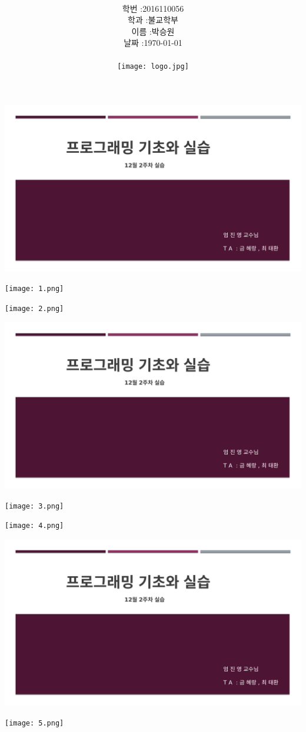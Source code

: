 \documentclass[11pt,a4paper]{article}
\title{
	\centering
	\pgfornament[width=12cm,color=teal]{84}\\
	\vspace{1cm}
	\fontsize{50}{50} \selectfont {기초 프로그래밍 실습\\12월 2주차}\\
		\pgfornament[width=12cm,color=teal]{88}\\
	\vfill}
\author{
	\LARGE
	\begin{tabular}{rl}
		\hline
		학번 : & 2016110056\\ 
		학과 : & 불교학부 \\
		이름 : & 박승원\\
		날짜 : & \today\\
		\hline
	\end{tabular}\vspace{2cm}
	\\
\texttt{[image: logo.jpg]}
	}
\date{}
\begin{document}
\maketitle
{}
\noindent
\lstset{language=C++, columns=flexible, tabsize=4, frame=shadowbox, showstringspaces=false, breaklines=true, upquote=true, basicstyle=\normalsize}
\begin{enumerate}
\includegraphics[page=2, width=\textwidth]{1.pdf}
	
\texttt{[image: 1.png]}	
	
\texttt{[image: 2.png]}	

\includegraphics[page=3, width=\textwidth]{1.pdf}
	
\texttt{[image: 3.png]}	
	
\texttt{[image: 4.png]}	


\includegraphics[page=4, width=\textwidth]{1.pdf}
	
\texttt{[image: 5.png]}	


\end{enumerate}
\end{document}
